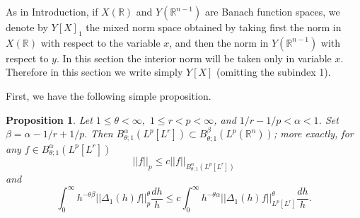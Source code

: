 \documentclass[12pt,twoside,reqno]{amsart}
\numberwithin{equation}{section}
\newtheorem{prop}[teo]{Proposition}
\theoremstyle{definition}
\numberwithin{equation}{section}
\def\a{\alpha}
\def\b{\beta}
\def\R{\mathbb{R}}
\def\t{\theta}
\begin{document}
As in Introduction, if $X(\R)$ and $Y(\R^{n-1})$ are Banach function spaces, we denote by $Y[X]_1$ the mixed norm space obtained by taking first the norm in $X(\R)$ with respect to the variable $x$, and then the norm in $Y(\R^{n-1})$ with respect to $y.$
In this section the interior norm will be taken only in variable $x.$ Therefore  in this section we  write simply $Y[X]$ (omitting the subindex 1).


First, we have the following simple proposition.
\begin{prop}\label{simple} Let $1\le\t<\infty,$ $1\le r<p<\infty$, and $1/r-1/p<\a<1$. Set $\b=\a-1/r+1/p.$ Then
$B^\a_{\t;1}(L^p[L^r])\subset B^\b _{\t;1}(L^p(\R^n))$; more exactly, for any $f\in B^\a_{\t;1}(L^p[L^r])$
\begin{equation}\label{simple1}
||f||_p\le c ||f||_{B^\a_{\t;1}(L^p[L^r])}
\end{equation}
and
\begin{equation}\label{simple2}
\int_0^\infty h^{-\t\b}||\Delta_1 (h)f||_p^\t\frac{dh}{h} \le c\int_0^\infty h^{-\t\a} ||\Delta_1(h)f||^\t_{L^p[L^r]}\frac{dh}{h}.
 \end{equation}
\end{prop}
\end{document}
